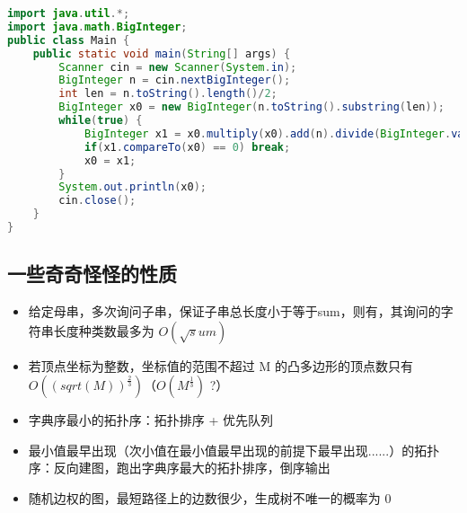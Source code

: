 \begin{lstlisting}[language=java]
import java.util.*;
import java.math.BigInteger;
public class Main {
    public static void main(String[] args) {
        Scanner cin = new Scanner(System.in);
        BigInteger n = cin.nextBigInteger();
        int len = n.toString().length()/2;
        BigInteger x0 = new BigInteger(n.toString().substring(len));
        while(true) {
            BigInteger x1 = x0.multiply(x0).add(n).divide(BigInteger.valueOf(2).multiply(x0));
            if(x1.compareTo(x0) == 0) break;
            x0 = x1;
        }
        System.out.println(x0);
        cin.close();
    }
}
\end{lstlisting}


\subsection{一些奇奇怪怪的性质}

\begin{itemize}
    \item 给定母串，多次询问子串，保证子串总长度小于等于sum，则有，其询问的字符串长度种类数最多为 $O(\sqrt sum)$
    \item 若顶点坐标为整数，坐标值的范围不超过 M 的凸多边形的顶点数只有 $O((sqrt(M))^\frac{2}{3}) （O(M^\frac{1}{3})$ ?）
    \item 字典序最小的拓扑序：拓扑排序 + 优先队列
    \item 最小值最早出现（次小值在最小值最早出现的前提下最早出现......）的拓扑序：反向建图，跑出字典序最大的拓扑排序，倒序输出
    \item 随机边权的图，最短路径上的边数很少，生成树不唯一的概率为 0
\end{itemize}
